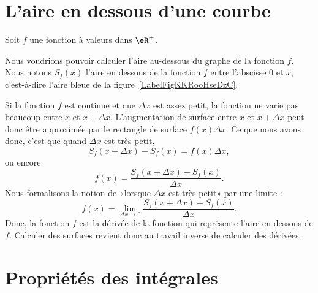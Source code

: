 \section{L'aire en dessous d'une courbe}

Soit \( f\) une fonction à valeurs dans \( \eR^+\).

Nous voudrions pouvoir calculer l'aire au-dessous du graphe de la fonction \( f\). Nous notons \( S_f(x)\) l'aire en dessous de la fonction \( f\) entre l'abscisse \( 0\) et \( x\), c'est-à-dire l'aire bleue de la figure~\ref{LabelFigKKRooHseDzC}.

\newcommand{\CaptionFigKKRooHseDzC}{L'aire en dessous d'une courbe. Le rectangle rouge d'aire \( f(x)\Delta x\) approxime de combien la surface augmente lorsqu'on passe de \( x\) à \( x+\Delta x\).}


Si la fonction \( f\) est continue et que \( \Delta x\) est assez petit, la fonction ne varie pas beaucoup entre \( x\) et \( x+\Delta x\). L'augmentation de surface entre \( x\) et \( x+\Delta x\) peut donc être approximée par le rectangle de surface \( f(x)\Delta x\). Ce que nous avons donc, c'est que quand \( \Delta x\) est très petit,
\begin{equation}
	S_f(x+\Delta x)-S_f(x)=f(x)\Delta x,
\end{equation}
ou encore
\begin{equation}
	f(x)=\frac{  S_f(x+\Delta x)-S_f(x)}{ \Delta x }.
\end{equation}
Nous formalisons la notion de «lorsque \( \Delta x\) est très petit» par une limite :
\begin{equation}
	f(x)=\lim_{\Delta x\to 0}\frac{  S_f(x+\Delta x)-S_f(x)}{ \Delta x }.
\end{equation}
Donc, la fonction \( f\) est la dérivée de la fonction qui représente l'aire en dessous de \( f\). Calculer des surfaces revient donc au travail inverse de calculer des dérivées.

\section{Propriétés des intégrales}

